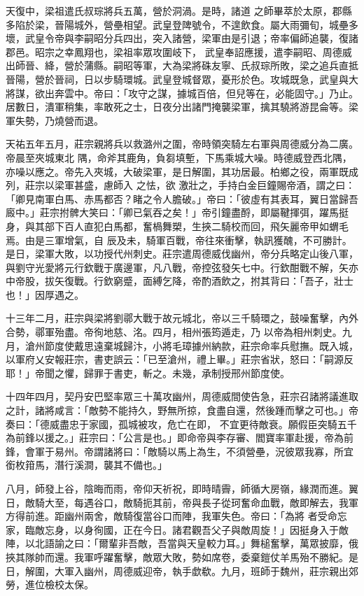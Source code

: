 \begin{pinyinscope}
 天復中，梁祖遣氏叔琮將兵五萬，營於洞渦。是時，諸道
 之師畢萃於太原，郡縣多陷於梁，晉陽城外，營壘相望。武皇登陴號令，不遑飲食。屬大雨彌旬，城壘多壞，武皇令帝與李嗣昭分兵四出，突入諸營，梁軍由是引退；帝率偏師追襲，復諸郡邑。昭宗之幸鳳翔也，梁祖率眾攻圍岐下，
 武皇奉詔應援，遣李嗣昭、周德威出師晉、絳，營於蒲縣。嗣昭等軍，大為梁將硃友寧、氏叔琮所敗，梁之追兵直抵晉陽，營於晉祠，日以步騎環城。武皇登城督眾，憂形於色。攻城既急，武皇與大將謀，欲出奔雲中。帝曰：「攻守之謀，據城百倍，但兒等在，必能固守。」乃止。居數日，潰軍稍集，率敢死之士，日夜分出諸門掩襲梁軍，擒其驍將游昆侖等。梁軍失勢，乃燒營而退。



 天祐五年五月，莊宗親將兵以救潞州之圍，帝時領突騎左右軍與周德威分為二廣。帝晨至夾城東北
 隅，命斧其鹿角，負芻填塹，下馬乘城大噪。時德威登西北隅，亦噪以應之。帝先入夾城，大破梁軍，是日解圍，其功居最。柏鄉之役，兩軍既成列，莊宗以梁軍甚盛，慮師入
 之怯，欲
 激壯之，手持白金巨鐘賜帝酒，謂之曰：「卿見南軍白馬、赤馬都否？睹之令人膽破。」帝曰：「彼虛有其表耳，翼日當歸吾廄中。」莊宗拊髀大笑曰：「卿已氣吞之矣！」帝引鐘盡酹，即屬鞬揮弭，躍馬挺身，與其部下百人直犯白馬都，奮楇舞槊，生挾二騎校而回，飛矢麗帝甲如蝟毛焉。由是三軍增氣，自
 辰及未，騎軍百戰，帝往來衝擊，執訊獲醜，不可勝計。是日，梁軍大敗，以功授代州刺史。莊宗遣周德威伐幽州，帝分兵略定山後八軍，與劉守光愛將元行欽戰于廣邊軍，凡八戰，帝控弦發矢七中。行欽酣戰不解，矢亦中帝股，拔矢復戰。行欽窮蹙，面縛乞降，帝酌酒飲之，拊其背曰：「吾子，壯士也！」因厚遇之。



 十三年二月，莊宗與梁將劉鄩大戰于故元城北，帝以三千騎環之，鼓噪奮擊，內外合勢，鄩軍殆盡。帝徇地慈、洺。四月，相州張筠遁走，乃
 以帝為相州刺史。九月，滄州節度使戴思遠棄城歸汴，小將毛璋據州納款，莊宗命率兵慰撫。既入城，以軍府乂安報莊宗，書吏誤云：「已至滄州，禮上畢。」莊宗省狀，怒曰：「嗣源反耶！」帝聞之懼，歸罪于書吏，斬之。未幾，承制授邢州節度使。



 十四年四月，契丹安巴堅率眾三十萬攻幽州，周德威間使告急，莊宗召諸將議進取之計，諸將咸言：「敵勢不能持久，野無所掠，食盡自還，然後踵而擊之可也。」帝奏曰：「德威盡忠于家國，孤城被攻，危亡在即，
 不宜更待敵衰。願假臣突騎五千為前鋒以援之。」莊宗曰：「公言是也。」即命帝與李存審、閻寶率軍赴援，帝為前鋒，會軍于易州。帝謂諸將曰：「敵騎以馬上為生，不須營壘，況彼眾我寡，所宜銜枚箝馬，潛行溪澗，襲其不備也。」



 八月，師發上谷，陰晦而雨，帝仰天祈祝，即時晴霽，師循大房嶺，緣潤而進。翼日，敵騎大至，每遇谷口，敵騎扼其前，帝與長子從珂奮命血戰，敵即解去，我軍方得前進。距幽州兩舍，敵騎復當谷口而陣，我軍失色。帝曰：「為將
 者受命忘家，臨敵忘身，以身徇國，正在今日。諸君觀吾父子與敵周旋！」因挺身入于敵陣，以北語諭之曰：「爾輩非吾敵，吾當與天皇較力耳。」舞槌奮擊，萬眾披靡，俄挾其隊帥而還。我軍呼躍奮擊，敵眾大敗，勢如席卷，委棄鎧仗羊馬殆不勝紀。是日，解圍，大軍入幽州，周德威迎帝，執手歔欷。九月，班師于魏州，莊宗親出郊勞，進位檢校太保。




\end{pinyinscope}
